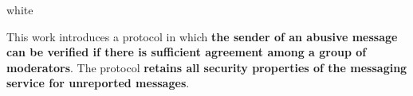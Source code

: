 \documentclass{ali-poster}
\begin{document}
\hspace{\marginwidth}
% 
% 
\begin{panel}{\centerwidth}{white}
	\maketitle

	\vspace{2cm}

	\hfill\parbox{\dimexpr\centerwidth-4cm\relax}{
		\LARGE
		This work introduces a protocol in which {\bf\color{highlightcolor1} the sender of an abusive message can be verified if there is sufficient agreement among a group of moderators}.
		The protocol {\bf\color{highlightcolor2} retains all security properties of the messaging service for unreported messages}.

	}\hfill\null

	\vspace{4cm}

	\begin{center}
		
	\end{center}




\end{panel}%
\hspace{\marginwidth}
% 
% 
\end{document}
